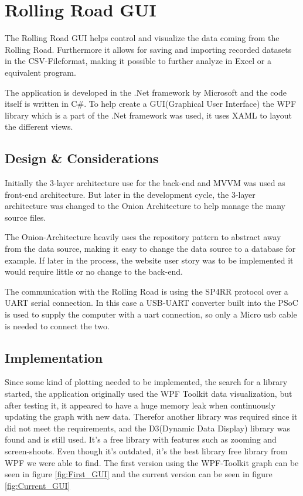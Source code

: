 \section{Rolling Road GUI}

The Rolling Road GUI helps control and visualize the data coming from the Rolling Road. Furthermore it allows for saving and importing recorded datasets in the CSV-Fileformat, making it possible to further analyze in Excel or a equivalent program.

The application is developed in the .Net framework by Microsoft and the code itself is written in C\#.
To help create a GUI(Graphical User Interface) the WPF library which is a part of the .Net framework was used, it uses XAML to layout the different views.

\subsection{Design \& Considerations}
Initially the 3-layer architecture use for the back-end and MVVM was used as front-end architecture. But later in the development cycle, the 3-layer architecture was changed to the Onion Architecture to help manage the many source files.

The Onion-Architecture heavily uses the repository pattern to abstract away from the data source, making it easy to change the data source to a database for example. If later in the process, the website user story was to be implemented it would require little or no change to the back-end.

The communication with the Rolling Road is using the SP4RR protocol over a UART serial connection. In this case a USB-UART converter built into the PSoC is used to supply the computer with a uart connection, so only a Micro usb cable is needed to connect the two.

\subsection{Implementation}
Since some kind of plotting needed to be implemented, the search for a library started, the application originally used the WPF Toolkit data visualization\cite{WPf_Toolkit}, but after testing it, it appeared to have a huge memory leak when continuously updating the graph with new data. Therefor another library was required since it did not meet the requirements, and the D3(Dynamic Data Display) library\cite{WPf_D3} was found and is still used. It's a free library with features such as zooming and screen-shoots. Even though it's outdated, it's the best library free library from WPF we were able to find. The first version using the WPF-Toolkit graph can be seen in figure \vref{fig:First_GUI} and the current version can be seen in figure \vref{fig:Current_GUI}

